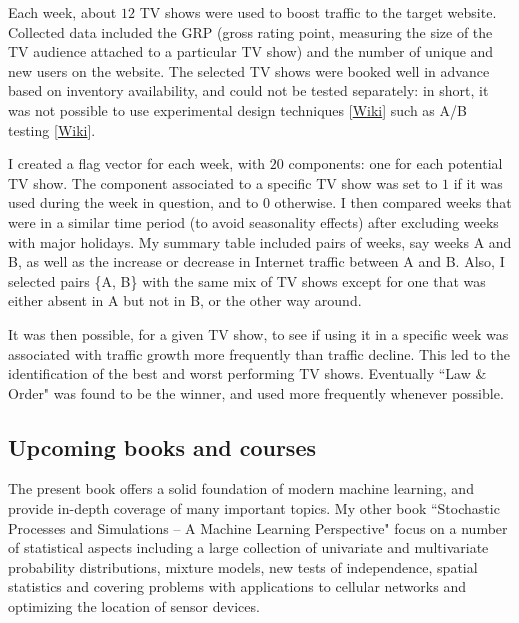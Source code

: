 \documentclass[oneside,10pt]{book}
\begin{document}
Each week, about $12$ TV shows were used to boost traffic to the target website. Collected data included the GRP (gross rating point, measuring the size of the TV audience attached to a particular TV show) and the number of unique and new users on the website. The selected TV shows were booked well in advance based on inventory availability, and could not be tested separately: in short, it was not possible to use \textcolor{index}{experimental design} techniques [\href{https://en.wikipedia.org/wiki/Design_of_experiments}{Wiki}] such as \textcolor{index}{A/B testing} [\href{https://en.wikipedia.org/wiki/A/B_testing}{Wiki}].

I created a \textcolor{index}{flag vector} for each week, with $20$ components: one for each potential TV show. The component associated to a specific TV show was set to $1$ if it was used during the week in question, and to $0$ otherwise. I then compared weeks that were in a similar time period (to avoid seasonality effects) after excluding weeks with major holidays.  My summary table included pairs of weeks, say weeks A and B, as well as the increase or decrease in Internet traffic between A and B. Also, I selected pairs \{A,  B\}  with the same mix of TV shows except for one that was either absent in A but not in B, or the other way around.

It was then possible, for a given TV show, to see if using it in a specific week was associated with traffic growth more frequently than traffic decline. This led to the identification of the best and worst performing TV shows. Eventually ``Law \& Order" was found to be the winner, and used more frequently whenever possible.

\subsection{Upcoming books and courses}

The present book offers a solid foundation of modern machine learning, and provide in-depth coverage of many important topics.  My other book ``Stochastic Processes and Simulations -- A Machine Learning Perspective" \cite{vgsimulnew}  focus on a number of statistical aspects including a large collection of univariate and multivariate probability distributions, mixture models, new tests of independence, spatial statistics and covering problems with applications to cellular networks and optimizing the location of sensor devices.
\end{document}
